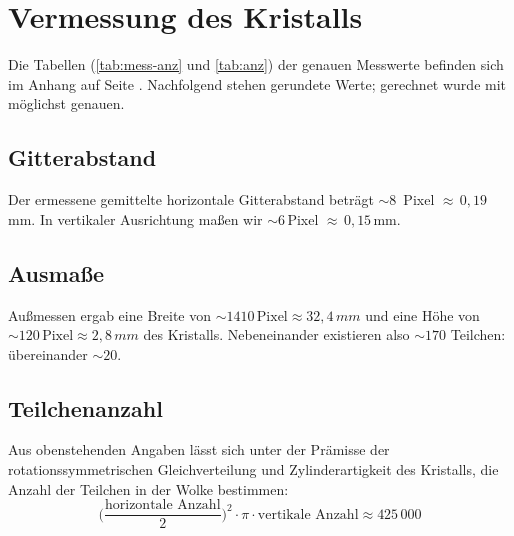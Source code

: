 
\section{Vermessung des Kristalls}
Die Tabellen (\ref{tab:mess-anz} und \ref{tab:anz}) der genauen Messwerte befinden sich im Anhang auf Seite \pageref{tab:mess-anz}. Nachfolgend stehen gerundete Werte; gerechnet wurde mit möglichst genauen.
\subsection{Gitterabstand}
Der ermessene gemittelte horizontale Gitterabstand beträgt $\sim8\,$ Pixel $\approx\,0,19\,$mm. In vertikaler Ausrichtung maßen wir $\sim6\,$Pixel $\approx\,0,15\,$mm.  
\subsection{Ausmaße}
Außmessen ergab eine Breite von $\sim1410\,\text{Pixel}\approx32,4\,mm$ und eine Höhe von $\sim120\,\text{Pixel}\approx2,8\,mm$ des Kristalls. Nebeneinander existieren also $\sim170$ Teilchen: übereinander $\sim20$. 
\subsection{Teilchenanzahl}
Aus obenstehenden Angaben lässt sich unter der Prämisse der rotationssymmetrischen Gleichverteilung und Zylinderartigkeit des Kristalls, die Anzahl der Teilchen in der Wolke bestimmen: $$\bigg(\frac{\text{horizontale Anzahl}}{2}\bigg)^2\cdot\pi\cdot\text{vertikale Anzahl} \approx 425\,000$$




